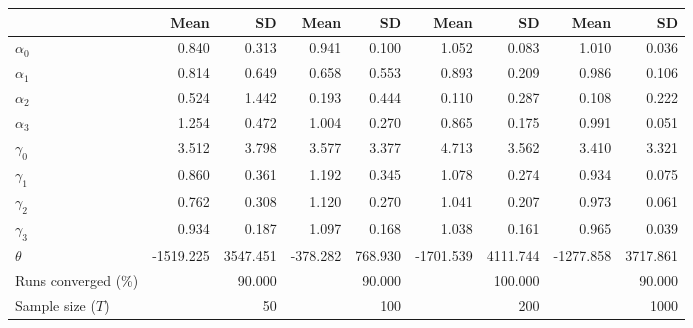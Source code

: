 
\begin{tabular}[t]{lrrrrrrrr}
\toprule
  & Mean & SD & Mean  & SD  & Mean   & SD   & Mean    & SD   \\
\midrule
$\alpha_{0}$ & 0.840 & 0.313 & 0.941 & 0.100 & 1.052 & 0.083 & 1.010 & 0.036\\
$\alpha_{1}$ & 0.814 & 0.649 & 0.658 & 0.553 & 0.893 & 0.209 & 0.986 & 0.106\\
$\alpha_{2}$ & 0.524 & 1.442 & 0.193 & 0.444 & 0.110 & 0.287 & 0.108 & 0.222\\
$\alpha_{3}$ & 1.254 & 0.472 & 1.004 & 0.270 & 0.865 & 0.175 & 0.991 & 0.051\\
$\gamma_{0}$ & 3.512 & 3.798 & 3.577 & 3.377 & 4.713 & 3.562 & 3.410 & 3.321\\
$\gamma_{1}$ & 0.860 & 0.361 & 1.192 & 0.345 & 1.078 & 0.274 & 0.934 & 0.075\\
$\gamma_{2}$ & 0.762 & 0.308 & 1.120 & 0.270 & 1.041 & 0.207 & 0.973 & 0.061\\
$\gamma_{3}$ & 0.934 & 0.187 & 1.097 & 0.168 & 1.038 & 0.161 & 0.965 & 0.039\\
$\theta$ & -1519.225 & 3547.451 & -378.282 & 768.930 & -1701.539 & 4111.744 & -1277.858 & 3717.861\\
Runs converged (\%) &  & 90.000 &  & 90.000 &  & 100.000 &  & 90.000\\
Sample size ($T$) &  & 50 &  & 100 &  & 200 &  & 1000\\
\bottomrule
\end{tabular}
